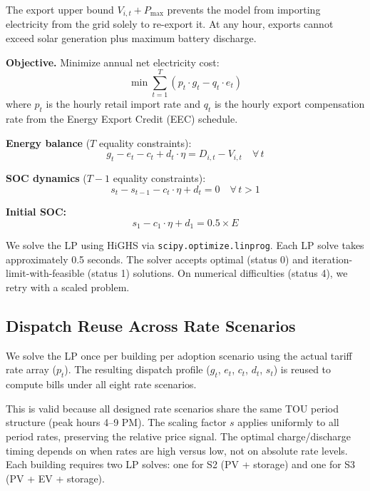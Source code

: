 \documentclass[11pt]{article}
\begin{document}
The export upper bound $V_{i,t} + P_{\max}$ prevents the model from importing electricity from the grid solely to re-export it. At any hour, exports cannot exceed solar generation plus maximum battery discharge.

\textbf{Objective.} Minimize annual net electricity cost:
\begin{equation}
\min \sum_{t=1}^{T} \left(p_t \cdot g_t - q_t \cdot e_t\right)
\end{equation}
where $p_t$ is the hourly retail import rate and $q_t$ is the hourly export compensation rate from the Energy Export Credit (EEC) schedule.

\textbf{Energy balance} ($T$ equality constraints):
\begin{equation}
g_t - e_t - c_t + d_t \cdot \eta = D_{i,t} - V_{i,t} \quad \forall\, t
\end{equation}

\textbf{SOC dynamics} ($T - 1$ equality constraints):
\begin{equation}
s_t - s_{t-1} - c_t \cdot \eta + d_t = 0 \quad \forall\, t > 1
\end{equation}

\textbf{Initial SOC:}
\begin{equation}
s_1 - c_1 \cdot \eta + d_1 = 0.5 \times E
\end{equation}

We solve the LP using HiGHS via \texttt{scipy.optimize.linprog}. Each LP solve takes approximately 0.5 seconds. The solver accepts optimal (status 0) and iteration-limit-with-feasible (status 1) solutions. On numerical difficulties (status 4), we retry with a scaled problem.

\subsection{Dispatch Reuse Across Rate Scenarios}

We solve the LP once per building per adoption scenario using the actual tariff rate array ($p_t$). The resulting dispatch profile ($g_t$, $e_t$, $c_t$, $d_t$, $s_t$) is reused to compute bills under all eight rate scenarios.

This is valid because all designed rate scenarios share the same TOU period structure (peak hours 4--9 PM). The scaling factor $s$ applies uniformly to all period rates, preserving the relative price signal. The optimal charge/discharge timing depends on when rates are high versus low, not on absolute rate levels. Each building requires two LP solves: one for S2 (PV + storage) and one for S3 (PV + EV + storage).
\end{document}
